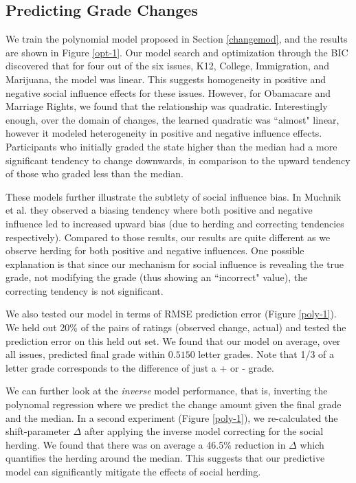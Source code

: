 \subsection{Predicting Grade Changes}
We train the polynomial model proposed in Section \ref{changemod}, and the results are shown in Figure \ref{opt-1}.
Our model search and optimization through the BIC discovered that for four out of the six issues, K12, College, Immigration, and Marijuana, the model was linear.
This suggests homogeneity in positive and negative social influence effects for these issues.
However, for Obamacare and Marriage Rights, we found that the relationship was quadratic.
Interestingly enough, over the domain of changes, the learned quadratic was ``almost" linear, however it modeled heterogeneity in positive and negative influence effects.
Participants who initially graded the state higher than the median had a more significant tendency to change downwards, in comparison to the upward tendency of those who graded less than the median.

These models further illustrate the subtlety of social influence bias. 
In Muchnik et al. they observed a biasing tendency where both positive and negative influence led to increased upward bias (due to herding and correcting tendencies respectively).
Compared to those results, our results are quite different as we observe herding for both positive and negative influences.
One possible explanation is that since our mechanism for social influence is revealing the true grade, not modifying the grade (thus showing an ``incorrect" value), the correcting tendency is not significant.

We also tested our model in terms of RMSE prediction error (Figure \ref{poly-1}). 
We held out 20\% of the pairs of ratings (observed change, actual) and tested the prediction error on this held out set.
We found that our model on average, over all issues, predicted final grade within $0.5150$ letter grades.
Note that 1/3 of a letter grade corresponds to the difference of just a + or - grade.

We can further look at the \emph{inverse} model performance, that is, inverting the polynomal regression where we predict the change amount given the final grade and the median.
In a second experiment (Figure \ref{poly-1}), we re-calculated the shift-parameter $\Delta$ after applying the inverse model correcting for the social herding.
We found that there was on average a 46.5\% reduction in $\Delta$ which quantifies the herding around the median. 
This suggests that our predictive model can significantly mitigate the effects of social herding.

